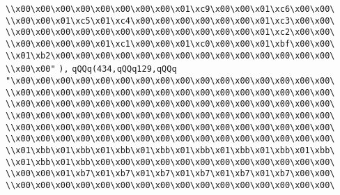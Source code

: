 \verb|\\x00\x00\x00\x00\x00\x00\x00\x00\x01\xc9\x00\x00\x01\xc6\x00\x00\|\newline
\verb|\\x00\x00\x01\xc5\x01\xc4\x00\x00\x00\x00\x00\x00\x01\xc3\x00\x00\|\newline
\verb|\\x00\x00\x00\x00\x00\x00\x00\x00\x00\x00\x00\x00\x01\xc2\x00\x00\|\newline
\verb|\\x00\x00\x00\x00\x01\xc1\x00\x00\x01\xc0\x00\x00\x01\xbf\x00\x00\|\newline
\verb|\\x01\xb2\x00\x00\x00\x00\x00\x00\x00\x00\x00\x00\x00\x00\x00\x00\|\newline
\verb|\\x00\x00"|\newline
\verb|),|\newline
\verb|qQQq(434,qQQq129,qQQq|\newline
\verb|"\x00\x00\x00\x00\x00\x00\x00\x00\x00\x00\x00\x00\x00\x00\x00\x00\|\newline
\verb|\\x00\x00\x00\x00\x00\x00\x00\x00\x00\x00\x00\x00\x00\x00\x00\x00\|\newline
\verb|\\x00\x00\x00\x00\x00\x00\x00\x00\x00\x00\x00\x00\x00\x00\x00\x00\|\newline
\verb|\\x00\x00\x00\x00\x00\x00\x00\x00\x00\x00\x00\x00\x00\x00\x00\x00\|\newline
\verb|\\x00\x00\x00\x00\x00\x00\x00\x00\x00\x00\x00\x00\x00\x00\x00\x00\|\newline
\verb|\\x00\x00\x00\x00\x00\x00\x00\x00\x00\x00\x00\x00\x00\x00\x00\x00\|\newline
\verb|\\x01\xbb\x01\xbb\x01\xbb\x01\xbb\x01\xbb\x01\xbb\x01\xbb\x01\xbb\|\newline
\verb|\\x01\xbb\x01\xbb\x00\x00\x00\x00\x00\x00\x00\x00\x00\x00\x00\x00\|\newline
\verb|\\x00\x00\x01\xb7\x01\xb7\x01\xb7\x01\xb7\x01\xb7\x01\xb7\x00\x00\|\newline
\verb|\\x00\x00\x00\x00\x00\x00\x00\x00\x00\x00\x00\x00\x00\x00\x00\x00\|\newline
